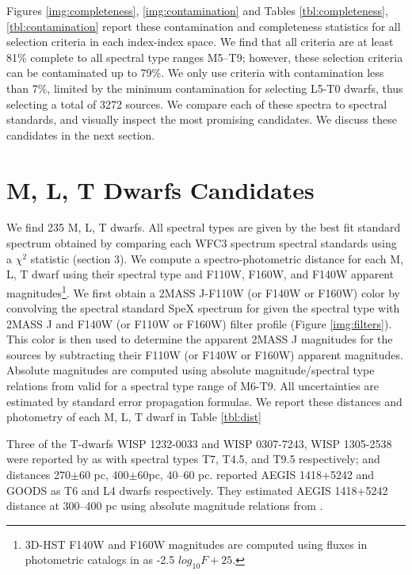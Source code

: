 \documentclass[manuscript]{aastex}
\begin{document}
Figures \ref{img:completeness}, \ref{img:contamination} and  Tables \ref{tbl:completeness}, \ref{tbl:contamination} report these contamination and completeness statistics for all selection criteria in each index-index space. We find that all criteria are at least 81\% complete to all spectral type ranges M5--T9; however, these selection criteria can be contaminated up to 79\%. We only use criteria with contamination less than 7\%, limited by the minimum contamination for  selecting L5-T0 dwarfs, thus selecting a total of  3272 sources. We  compare each of these spectra to spectral standards, and visually inspect the most promising candidates. We discuss these candidates in the next section.

\section{M, L, T Dwarfs Candidates}

We find 235 M, L, T dwarfs. All spectral types are given by the best fit standard spectrum obtained by comparing each WFC3 spectrum spectral standards using a $\chi^2$ statistic (section 3). We compute  a spectro-photometric distance for each M, L, T dwarf using their spectral type and F110W, F160W, and F140W apparent magnitudes\footnote{3D-HST F140W and F160W magnitudes are computed using fluxes in photometric catalogs in \citealt{Skelton2014} as -2.5  $log_{10}F+ 25$. }. We first obtain a 2MASS J-F110W (or F140W or F160W) color by convolving the spectral standard SpeX spectrum  for given the spectral type with 2MASS J and F140W (or F110W or F160W) filter profile (Figure \ref{img:filters}). This color is then used to determine the apparent 2MASS J magnitudes for the sources by subtracting their F110W (or F140W or F160W) apparent magnitudes. Absolute magnitudes are computed using absolute magnitude/spectral type relations from \citealt{2012ApJS..201...19D} valid for a spectral type range of M6-T9. All uncertainties are estimated by standard error propagation formulas. We report these distances and photometry of each M, L, T dwarf in Table \ref{tbl:dist}

Three of the T-dwarfs WISP 1232-0033 and WISP 0307-7243, WISP 1305-2538 were reported by \cite{2012ApJ...752L..14M} as  with spectral types T7, T4.5, and T9.5 respectively; and distances 270$\pm$60 pc, 400$\pm$60pc, 40--60 pc. \cite{2012ApJS..200...13B} reported  AEGIS 1418+5242 and GOODS as T6 and L4 dwarfs respectively. They estimated AEGIS 1418+5242  distance at 300--400 pc using absolute magnitude relations from \cite{2004AJ....127.2948V}.
\end{document}
